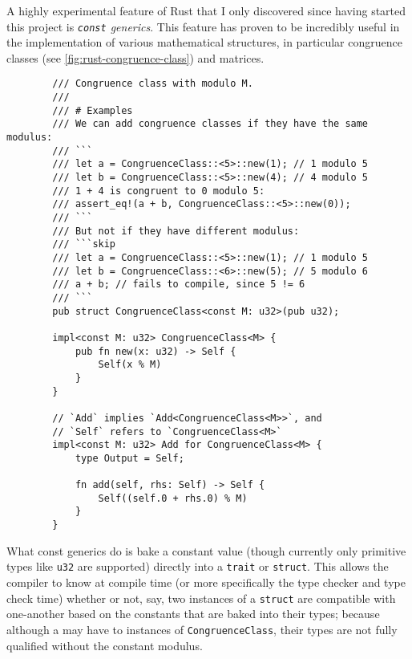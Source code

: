 \documentclass{report}
\newenvironment{code}{\captionsetup{type=listing}}{}
\begin{document}
A highly experimental feature of Rust that I only discovered since having
started this project is \emph{\texttt{const} generics}. This feature has proven to
be incredibly useful in the implementation of various mathematical structures,
in particular congruence classes (see \cref{fig:rust-congruence-class}) and
matrices.
\begin{code}
    \begin{verbatim}
        /// Congruence class with modulo M.
        ///
        /// # Examples
        /// We can add congruence classes if they have the same modulus:
        /// ```
        /// let a = CongruenceClass::<5>::new(1); // 1 modulo 5
        /// let b = CongruenceClass::<5>::new(4); // 4 modulo 5
        /// 1 + 4 is congruent to 0 modulo 5:
        /// assert_eq!(a + b, CongruenceClass::<5>::new(0));
        /// ```
        /// But not if they have different modulus:
        /// ```skip
        /// let a = CongruenceClass::<5>::new(1); // 1 modulo 5
        /// let b = CongruenceClass::<6>::new(5); // 5 modulo 6
        /// a + b; // fails to compile, since 5 != 6
        /// ```
        pub struct CongruenceClass<const M: u32>(pub u32);

        impl<const M: u32> CongruenceClass<M> {
            pub fn new(x: u32) -> Self {
                Self(x % M)
            }
        }

        // `Add` implies `Add<CongruenceClass<M>>`, and
        // `Self` refers to `CongruenceClass<M>`
        impl<const M: u32> Add for CongruenceClass<M> {
            type Output = Self;

            fn add(self, rhs: Self) -> Self {
                Self((self.0 + rhs.0) % M)
            }
        }
    \end{verbatim}
    \caption{%
        Excerpt of my implementation of congruence classes in Rust,
        using traits and the const generic feature.
    }
    \label{fig:rust-congruence-class}
\end{code}
\noindent
What const generics do is bake a constant value (though currently
only primitive types like \texttt{u32} are supported) directly into a \texttt{trait}
or \texttt{struct}. This allows the compiler to know at compile time (or more
specifically the type checker and type check time) whether or not, say, two
instances of a \texttt{struct} are compatible with one-another based on the
constants that are baked into their types; because although a may have to
instances of \texttt{CongruenceClass}, their types are not fully qualified
without the constant modulus.
\end{document}
